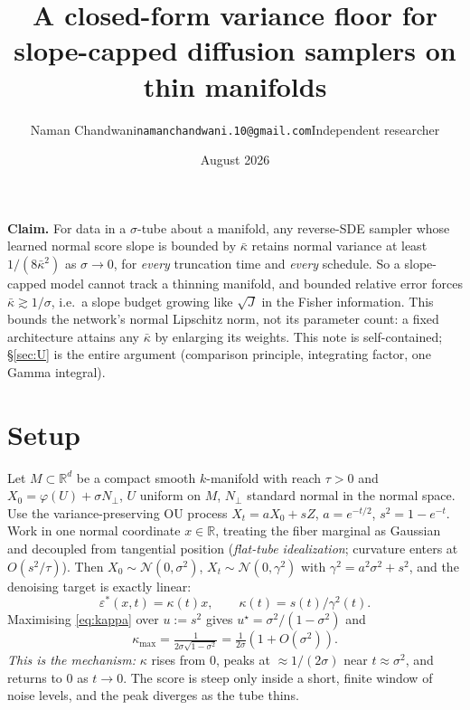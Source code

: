 \documentclass[10pt]{article}
\title{\vspace{-1.2em}\bf A closed-form variance floor for slope-capped diffusion samplers on thin manifolds}
\author{Naman Chandwani\quad\small\texttt{namanchandwani.10@gmail.com}\quad\small Independent researcher}
\date{\vspace{-0.6em}\small August 2026}
\newcommand{\kb}{\bar\kappa}
\newcommand{\sigsq}{\sigma^2}
\newcommand{\R}{\mathbb{R}}
\begin{document}
\maketitle
\vspace{-2.2em}

\noindent\textbf{Claim.} For data in a $\sigma$-tube about a manifold, any reverse-SDE sampler
whose learned normal score slope is bounded by $\kb$ retains normal variance at least
$1/(8\kb^2)$ as $\sigma\to0$, for \emph{every} truncation time and \emph{every} schedule. So a
slope-capped model cannot track a thinning manifold, and bounded relative error forces
$\kb\gtrsim1/\sigma$, i.e.\ a slope budget growing like $\sqrt J$ in the Fisher information. This bounds the
network's normal Lipschitz norm, not its parameter count: a fixed architecture attains any
$\kb$ by enlarging its weights. This note
is self-contained; \S\ref{sec:U} is the entire argument (comparison principle, integrating
factor, one Gamma integral).

\section{Setup}
Let $M\subset\R^d$ be a compact smooth $k$-manifold with reach $\tau>0$ and
$X_0=\varphi(U)+\sigma N_\perp$, $U$ uniform on $M$, $N_\perp$ standard normal in the normal
space. Use the variance-preserving OU process $X_t=aX_0+sZ$, $a=e^{-t/2}$, $s^2=1-e^{-t}$.
Work in one normal coordinate $x\in\R$, treating the fiber marginal as Gaussian and decoupled
from tangential position (\emph{flat-tube idealization}; curvature enters at $O(s^2/\tau)$).
Then $X_0\sim\mathcal N(0,\sigsq)$, $X_t\sim\mathcal N(0,\gamma^2)$ with
$\gamma^2=a^2\sigsq+s^2$, and the denoising target is exactly linear:
\begin{equation}
\varepsilon^*(x,t)=\kappa(t)x,\qquad \kappa(t)=s(t)/\gamma^2(t).
\label{eq:kappa}
\end{equation}
Maximising \eqref{eq:kappa} over $u:=s^2$ gives $u^\star=\sigsq/(1-\sigsq)$ and
\begin{equation}
\kappa_{\max}=\tfrac{1}{2\sigma\sqrt{1-\sigsq}}=\tfrac{1}{2\sigma}(1+O(\sigsq)).
\label{eq:peak}
\end{equation}
\emph{This is the mechanism:} $\kappa$ rises from $0$, peaks at $\approx1/(2\sigma)$ near
$t\approx\sigsq$, and returns to $0$ as $t\to0$. The score is steep only inside a short, finite
window of noise levels, and the peak diverges as the tube thins.
\end{document}
